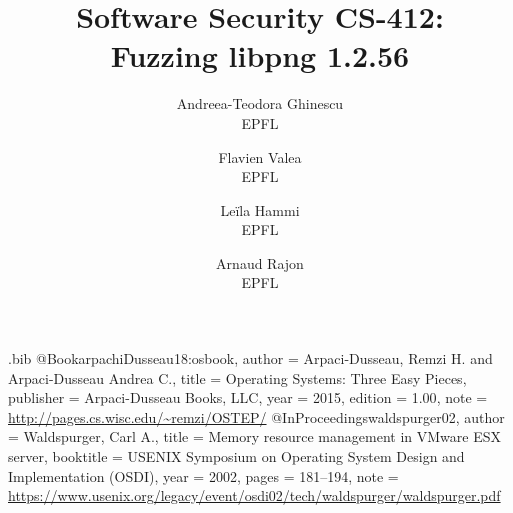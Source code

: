\usepackage{filecontents}

\begin{filecontents}{\jobname.bib}
@Book{arpachiDusseau18:osbook,
  author =       {Arpaci-Dusseau, Remzi H. and Arpaci-Dusseau Andrea C.},
  title =        {Operating Systems: Three Easy Pieces},
  publisher =    {Arpaci-Dusseau Books, LLC},
  year =         2015,
  edition =      {1.00},
  note =         {\url{http://pages.cs.wisc.edu/~remzi/OSTEP/}}
}
@InProceedings{waldspurger02,
  author =       {Waldspurger, Carl A.},
  title =        {Memory resource management in {VMware ESX} server},
  booktitle =    {USENIX Symposium on Operating System Design and
                  Implementation (OSDI)},
  year =         2002,
  pages =        {181--194},
  note =         {\url{https://www.usenix.org/legacy/event/osdi02/tech/waldspurger/waldspurger.pdf}}}
\end{filecontents}



\date{}

\title{\Large \bf Software Security CS-412: \\
  Fuzzing libpng 1.2.56 }

\author{
{\rm Andreea-Teodora Ghinescu}\\
EPFL
\and
{\rm Flavien Valea}\\
EPFL
\and
{\rm Leïla Hammi}\\
EPFL
\and
{\rm Arnaud Rajon}\\
EPFL
} %

\maketitle



